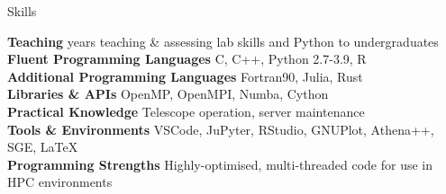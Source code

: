 \documentclass{resume} %
\begin{document}
\begin{rSection}{Skills}


{\bf Teaching}  years teaching \& assessing lab skills and Python to undergraduates \\
{\bf Fluent Programming Languages} \dotfill C, C++, Python 2.7-3.9, R \\
{\bf Additional Programming Languages} \dotfill Fortran90, Julia, Rust \\
{\bf Libraries \& APIs} \dotfill OpenMP, OpenMPI, Numba, Cython \\
{\bf Practical Knowledge} \dotfill Telescope operation, server maintenance \\
{\bf Tools \& Environments} \dotfill VSCode, JuPyter, RStudio, GNUPlot, Athena++, SGE, \LaTeX \\
{\bf Programming Strengths} \dotfill Highly-optimised, multi-threaded code for use in HPC environments

\end{rSection}





\end{document}
